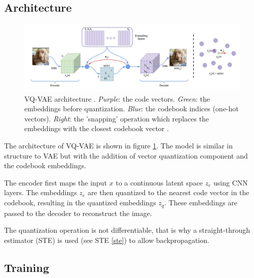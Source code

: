






\subsection{Architecture}

\begin{figure}[h]
    \centering
    \includegraphics[width=\textwidth]{images/vqvae_architecture.png}
    \caption{VQ-VAE architecture \cite{vqvae}. \textit{Purple}: the code vectors. \textit{Green}: the embeddings before quantization. \textit{Blue}: the codebook indices (one-hot vectors). \textit{Right}: the 'snapping' operation which replaces the embeddings with the closest codebook vector \cite{vqvae}.}
    \label{fig:vqvae_architecture}
\end{figure}

The architecture of VQ-VAE is shown in figure \ref{fig:vqvae_architecture}. The model is similar in structure to VAE but with the addition of vector quantization component and the codebook embeddings.

The encoder first maps the input $x$ to a continuous latent space $z_e$ using CNN layers. The embeddings $z_e$ are then quantized to the nearest code vector in the codebook, resulting in the quantized embeddings $z_q$. These embeddings are passed to the decoder to reconstruct the image.

The quantization operation is not differentiable, that is why a straight-through estimator (STE) is used (see STE \ref{ste}) to allow backpropagation.







\subsection{Training}

